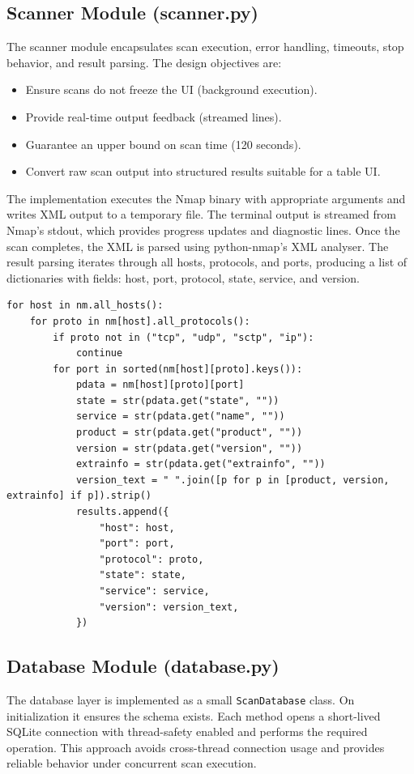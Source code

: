 \documentclass[12pt, a4paper]{report}
\begin{document}
\subsection{Scanner Module (scanner.py)}
The scanner module encapsulates scan execution, error handling, timeouts, stop behavior, and result parsing. The design objectives are:
\begin{itemize}[leftmargin=2.2em]
  \item Ensure scans do not freeze the UI (background execution).
  \item Provide real-time output feedback (streamed lines).
  \item Guarantee an upper bound on scan time (120 seconds).
  \item Convert raw scan output into structured results suitable for a table UI.
\end{itemize}

The implementation executes the Nmap binary with appropriate arguments and writes XML output to a temporary file. The terminal output is streamed from Nmap's stdout, which provides progress updates and diagnostic lines. Once the scan completes, the XML is parsed using python-nmap's XML analyser. The result parsing iterates through all hosts, protocols, and ports, producing a list of dictionaries with fields: host, port, protocol, state, service, and version.

\begin{lstlisting}[caption={Result parsing loop (scanner.py)},label={lst:parse}]
for host in nm.all_hosts():
    for proto in nm[host].all_protocols():
        if proto not in ("tcp", "udp", "sctp", "ip"):
            continue
        for port in sorted(nm[host][proto].keys()):
            pdata = nm[host][proto][port]
            state = str(pdata.get("state", ""))
            service = str(pdata.get("name", ""))
            product = str(pdata.get("product", ""))
            version = str(pdata.get("version", ""))
            extrainfo = str(pdata.get("extrainfo", ""))
            version_text = " ".join([p for p in [product, version, extrainfo] if p]).strip()
            results.append({
                "host": host,
                "port": port,
                "protocol": proto,
                "state": state,
                "service": service,
                "version": version_text,
            })
\end{lstlisting}

\subsection{Database Module (database.py)}
The database layer is implemented as a small \texttt{ScanDatabase} class. On initialization it ensures the schema exists. Each method opens a short-lived SQLite connection with thread-safety enabled and performs the required operation. This approach avoids cross-thread connection usage and provides reliable behavior under concurrent scan execution.
\end{document}
